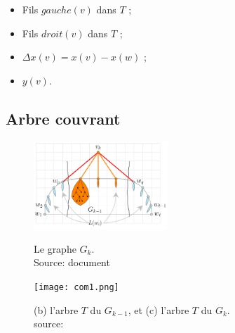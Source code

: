 \documentclass[10pt]{beamer}
\begin{document}
{\begin{frame}{}
\centering
\begin{minipage}{0.5\textwidth}
    \begin{block}{}
     \begin{itemize}
		\item \small Fils $gauche(v)$ dans $T$ ; 
		\item \small Fils $droit(v)$ dans $T$ ; 
		\item \small $\Delta x(v) = x(v) - x(w) $ ; 
		\item \small $y(v)$.
    \end{itemize}
    \end{block}
\end{minipage}

\end{frame}	
}

\subsection{Arbre couvrant} 	
{
\begin{frame}{}

    \begin{figure}
		\centering
		\includegraphics[width=0.45\textwidth]{sd1.png}\\[-.2cm]
    \caption[caption]{Le graphe $G_k$. \\\vspace*{0.1cm} Source: document \citeauthor{PhilippKindermann}}	
	\end{figure}

    \begin{figure}
        \centering
        \texttt{[image: com1.png]}\\[-.2cm]
		\caption[caption]{(b) l'arbre $T$ du $G_{k-1}$, et (c) l'arbre $T$ du $G_{k}$. \\\vspace*{0.1cm} source:\citeauthor{TakaoSaidur}} 
	\end{figure}
    	
\end{frame}	
}
  
\end{document}
